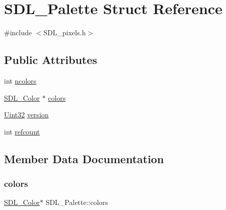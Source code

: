 \hypertarget{struct_s_d_l___palette}{}\section{S\+D\+L\+\_\+\+Palette Struct Reference}
\label{struct_s_d_l___palette}


{\ttfamily \#include $<$S\+D\+L\+\_\+pixels.\+h$>$}

\subsection*{Public Attributes}
\begin{DoxyCompactItemize}
\item 
int \mbox{\hyperlink{struct_s_d_l___palette_a81a0cc3197480e994c6b06f1f0567091}{ncolors}}
\item 
\mbox{\hyperlink{struct_s_d_l___color}{S\+D\+L\+\_\+\+Color}} $\ast$ \mbox{\hyperlink{struct_s_d_l___palette_ad757a50037f43533196e94942440b241}{colors}}
\item 
\mbox{\hyperlink{_s_d_l__stdinc_8h_add440eff171ea5f55cb00c4a9ab8672d}{Uint32}} \mbox{\hyperlink{struct_s_d_l___palette_a5b8d45519f6850a32f13f1602ce37a8e}{version}}
\item 
int \mbox{\hyperlink{struct_s_d_l___palette_a35c667737f883f973bb0a8dea143b08d}{refcount}}
\end{DoxyCompactItemize}


\subsection{Member Data Documentation}
\mbox{\label{struct_s_d_l___palette_ad757a50037f43533196e94942440b241}} 
\subsubsection{\texorpdfstring{colors}{colors}}
{\footnotesize\ttfamily \mbox{\hyperlink{struct_s_d_l___color}{S\+D\+L\+\_\+\+Color}}$\ast$ S\+D\+L\+\_\+\+Palette\+::colors}

\mbox{\label{struct_s_d_l___palette_a81a0cc3197480e994c6b06f1f0567091}} 
